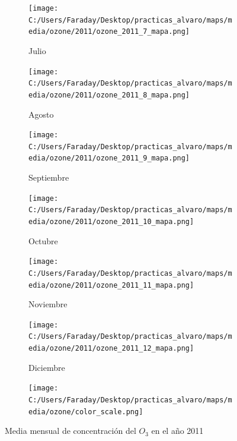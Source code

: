 \documentclass[12pt]{article}
\begin{document}
\begin{figure}[H]
\begin{subfigure}[H]{0.15\textwidth}
\texttt{[image: C:/Users/Faraday/Desktop/practicas\_alvaro/maps/media/ozone/2011/ozone\_2011\_7\_mapa.png]}
\captionsetup{labelformat=empty}
\caption{Julio}
\label{fig:map-ozone-2011-7}
\end{subfigure}
%
\begin{subfigure}[H]{0.15\textwidth}
\texttt{[image: C:/Users/Faraday/Desktop/practicas\_alvaro/maps/media/ozone/2011/ozone\_2011\_8\_mapa.png]}
\captionsetup{labelformat=empty}
\caption{Agosto}
\label{fig:map-ozone-2011-8}
\end{subfigure}
%
\begin{subfigure}[H]{0.15\textwidth}
\texttt{[image: C:/Users/Faraday/Desktop/practicas\_alvaro/maps/media/ozone/2011/ozone\_2011\_9\_mapa.png]}
\captionsetup{labelformat=empty}
\caption{Septiembre}
\label{fig:map-ozone-2011-9}
\end{subfigure}
%
\begin{subfigure}[H]{0.15\textwidth}
\texttt{[image: C:/Users/Faraday/Desktop/practicas\_alvaro/maps/media/ozone/2011/ozone\_2011\_10\_mapa.png]}
\captionsetup{labelformat=empty}
\caption{Octubre}
\label{fig:map-ozone-2011-10}
\end{subfigure}
%
\begin{subfigure}[H]{0.15\textwidth}
\texttt{[image: C:/Users/Faraday/Desktop/practicas\_alvaro/maps/media/ozone/2011/ozone\_2011\_11\_mapa.png]}
\captionsetup{labelformat=empty}
\caption{Noviembre}
\label{fig:map-ozone-2011-11}
\end{subfigure}
%
\begin{subfigure}[H]{0.15\textwidth}
\texttt{[image: C:/Users/Faraday/Desktop/practicas\_alvaro/maps/media/ozone/2011/ozone\_2011\_12\_mapa.png]}
\captionsetup{labelformat=empty}
\caption{Diciembre}
\label{fig:map-ozone-2011-12}
\end{subfigure}

\begin{subfigure}[H]{0.45\textwidth}
\texttt{[image: C:/Users/Faraday/Desktop/practicas\_alvaro/maps/media/ozone/color\_scale.png]}
\captionsetup{labelformat=empty}
\caption{}
\end{subfigure}

\vspace*{-7mm}
\caption{Media mensual de concentración del $O_{3}$ en el año 2011}
\label{fig:map-ozone-2011}
\end{figure}
\end{document}
